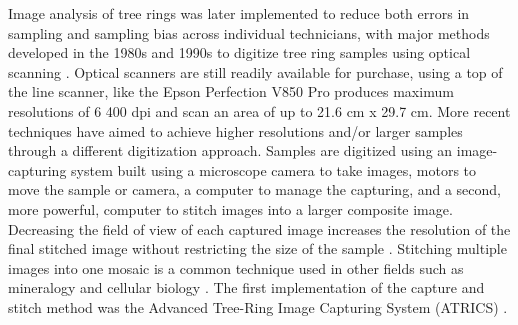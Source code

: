 \documentclass[a4paper,12pt]{article}
\begin{document}
Image analysis of tree rings was later implemented to reduce both errors in sampling and sampling bias across individual technicians, with major methods developed in the 1980s and 1990s to digitize tree ring samples using optical scanning \citep{mcmillin_application_1982} \citep{guay_new_1992}. Optical scanners are still readily available for purchase, using a top of the line scanner, like the Epson Perfection V850 Pro produces maximum resolutions of 6 400 dpi and scan an area of up to 21.6 cm x 29.7 cm.
More recent techniques have aimed to achieve higher resolutions and/or larger samples through a different digitization approach. Samples are digitized using an image-capturing system built using a microscope camera to take images, motors to move the sample or camera, a computer to manage the capturing, and a second, more powerful, computer to stitch images into a larger composite image.
Decreasing the field of view of each captured image increases the resolution of the final stitched image without restricting the size of the sample \citep{muhlich_stitching_2022}.
Stitching multiple images into one mosaic is a common technique used in other fields such as mineralogy and cellular biology \citep{ro_image_2021,mohammadi_fast_2024}. 
The first implementation of the capture and stitch method was the Advanced Tree-Ring Image Capturing System (ATRICS) \citep{levanic_atrics_2007}. %
\end{document}
